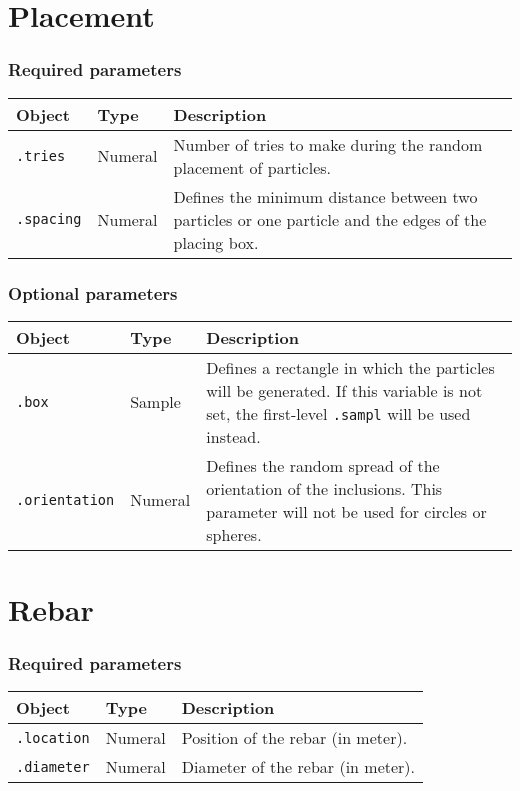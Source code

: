 \documentclass[10pt]{article}
\begin{document}
\section{Placement}

\subsubsection*{Required parameters}

\begin{tabularx}{\textwidth}{llX}
\hline 
Object & Type & Description \\ 
\hline 
\verb+.tries+ & Numeral & Number of tries to make during the random placement of particles. \\ 
\verb+.spacing+ & Numeral & Defines the minimum distance between two particles or one particle and the edges of the placing box. \\ 
\hline 
\end{tabularx}

\subsubsection*{Optional parameters}

\begin{tabularx}{\textwidth}{llX}
\hline 
Object & Type & Description \\ 
\hline 
\verb+.box+ & Sample & Defines a rectangle in which the particles will be generated. If this variable is not set, the first-level \verb+.sampl+ will be used instead. \\ 
\verb+.orientation+ & Numeral & Defines the random spread of the orientation of the inclusions. This parameter will not be used for circles or spheres. \\ 
\hline 
\end{tabularx}

\section{Rebar}

\subsubsection*{Required parameters}

\begin{tabularx}{\textwidth}{llX}
\hline 
Object & Type & Description \\ 
\hline 
\verb+.location+ & Numeral & Position of the rebar (in meter). \\ 
\verb+.diameter+ & Numeral & Diameter of the rebar (in meter).\\
\hline 
\end{tabularx}
\end{document}
